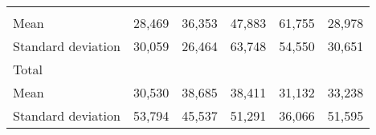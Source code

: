 \begin{tabular}{llllll}
  \multicolumn{1}{r}{} &
  \multicolumn{1}{r}{} &
  \multicolumn{1}{r}{} &
  \multicolumn{1}{r}{} \\
\multicolumn{1}{l}{\hspace{4em}Mean} &
  \multicolumn{1}{|r}{28,469} &
  \multicolumn{1}{r}{36,353} &
  \multicolumn{1}{r}{47,883} &
  \multicolumn{1}{r}{61,755} &
  \multicolumn{1}{r}{28,978} \\
\multicolumn{1}{l}{\hspace{4em}Standard deviation} &
  \multicolumn{1}{|r}{30,059} &
  \multicolumn{1}{r}{26,464} &
  \multicolumn{1}{r}{63,748} &
  \multicolumn{1}{r}{54,550} &
  \multicolumn{1}{r}{30,651} \\
\multicolumn{1}{l}{\hspace{3em}Total} &
  \multicolumn{1}{|r}{} &
  \multicolumn{1}{r}{} &
  \multicolumn{1}{r}{} &
  \multicolumn{1}{r}{} &
  \multicolumn{1}{r}{} \\
\multicolumn{1}{l}{\hspace{4em}Mean} &
  \multicolumn{1}{|r}{30,530} &
  \multicolumn{1}{r}{38,685} &
  \multicolumn{1}{r}{38,411} &
  \multicolumn{1}{r}{31,132} &
  \multicolumn{1}{r}{33,238} \\
\multicolumn{1}{l}{\hspace{4em}Standard deviation} &
  \multicolumn{1}{|r}{53,794} &
  \multicolumn{1}{r}{45,537} &
  \multicolumn{1}{r}{51,291} &
  \multicolumn{1}{r}{36,066} &
  \multicolumn{1}{r}{51,595} \\
\cline{1-6}
\end{tabular}

